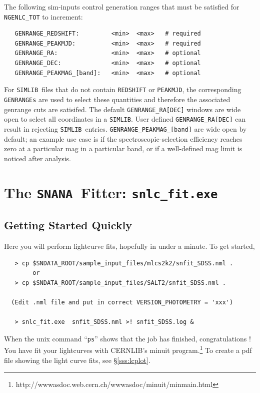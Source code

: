 \documentclass[12pt]{article}
\newcommand{\snfitter}{{\tt snlc\_fit.exe}}
\newcommand{\snana}{{\tt SNANA}}
\newcommand{\simlib}{{\tt SIMLIB}}
\newcommand{\wwwMINUIT}{http://wwwasdoc.web.cern.ch/wwwasdoc/minuit/minmain.html}
\newcommand{\minuit}{{\sc minuit}}
\begin{document}
The following sim-inputs control generation ranges that must be satisfied
for {\tt NGENLC\_TOT} to increment:
%
\begin{verbatim}
   GENRANGE_REDSHIFT:         <min>  <max>   # required
   GENRANGE_PEAKMJD:          <min>  <max>   # required
   GENRANGE_RA:               <min>  <max>   # optional
   GENRANGE_DEC:              <min>  <max>   # optional
   GENRANGE_PEAKMAG_[band]:   <min>  <max>   # optional
\end{verbatim}
%
For \simlib\ files that do not contain {\tt REDSHIFT} or {\tt PEAKMJD},
the corresponding {\tt GENRANGEs} are used to select these quantities and
therefore the associated genrange cuts are satisifed.
The default {\tt GENRANGE\_RA[DEC]} windows are wide open to select
all coordinates in a \simlib. User defined {\tt GENRANGE\_RA[DEC]}
can result in rejecting \simlib\ entries.
{\tt GENRANGE\_PEAKMAG\_[band]} are wide open by default;
an example use case is if the spectroscopic-selection 
efficiency reaches zero at a particular mag in a particular band,
or if a well-defined mag limit is noticed after analysis.



   \clearpage
   \section{The \snana\ Fitter:  \snfitter\ }
   \label{sec:snlc_fit}


   \subsection{Getting Started Quickly }
   \label{subsec:fit_start}

Here you will perform lightcurve fits, 
hopefully in under a minute. To get started,
%
\begin{verbatim}
   > cp $SNDATA_ROOT/sample_input_files/mlcs2k2/snfit_SDSS.nml .
        or
   > cp $SNDATA_ROOT/sample_input_files/SALT2/snfit_SDSS.nml .

  (Edit .nml file and put in correct VERSION_PHOTOMETRY = 'xxx')

   > snlc_fit.exe  snfit_SDSS.nml >! snfit_SDSS.log &
\end{verbatim}
%
When the unix command ``{\tt ps}'' shows that
the job has finished, congratulations !
You have fit your lightcurves with 
CERNLIB's {\minuit} program.\footnote{\wwwMINUIT}
To create a pdf file showing the light curve fits,
see \S\ref{sss:lcplot}.
\end{document}
